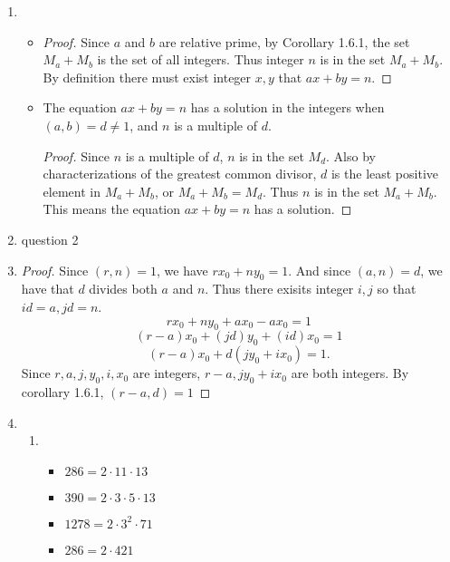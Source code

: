 \documentclass[11pt,a4paper]{article}
\begin{document}
\hrulefill

\begin{enumerate}
	\item
	\begin{itemize}
		\item \begin{proof} Since $a$ and $b$ are relative prime, by Corollary 1.6.1, the set $M_a+M_b$ is the set of all integers. Thus integer $n$ is in the set $M_a+M_b$. By definition there must exist integer $x, y$ that \(ax+by = n.\)\end{proof}
		\item The equation \(ax+by = n\) has a solution in the integers when \((a,b)= d \ne 1\), and $n$ is a multiple of $d$. \begin{proof} Since $n$ is a multiple of $d$, $n$ is in the set $M_d$. Also by characterizations of the greatest common divisor, $d$ is the least positive element in $M_a+M_b$, or $M_a+M_b = M_d$. Thus $n$ is in the set $M_a+M_b$. This means the equation \(ax+by = n\) has a solution.\end{proof}

	\end{itemize}

	\item question 2

	\item \begin{proof} Since $(r,n)=1$, we have $rx_0+ny_0=1.$ And since $(a,n)=d$, we have that $d$ divides both $a$ and $n$. Thus there exisits integer $i, j$ so that $id=a, jd=n$.
	\[rx_0+ny_0+ax_0-ax_0=1\] \[(r-a)x_0+(jd)y_0+(id)x_0=1\] \[(r-a)x_0+d(jy_0+ix_0)=1.\] Since $r, a, j, y_0, i, x_0$ are integers, $r-a, jy_0+ix_0$ are both integers. By corollary 1.6.1, \((r-a,d)=1\)\end{proof}

	\item
	 	\begin{enumerate}
	 		\item
			\begin{itemize}
				\item $286 = 2 \cdot 11 \cdot 13$
				\item $390 = 2 \cdot 3 \cdot 5 \cdot 13$
				\item $1278 = 2 \cdot 3^2 \cdot 71$
				\item $286 = 2 \cdot 421$
			\end{itemize}


\end{enumerate}
\end{enumerate}
\end{document}
